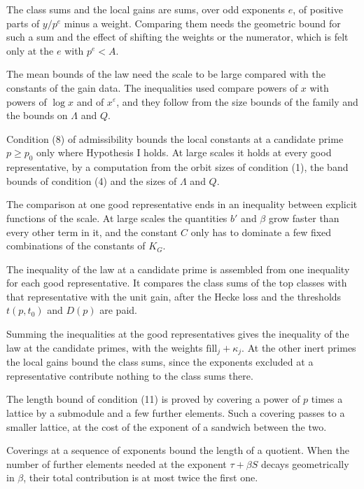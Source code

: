 The class sums and the local gains are sums, over odd exponents $e$, of positive parts of $y/p^e$
minus a weight. Comparing them needs the geometric bound for such a sum and the effect of shifting the
weights or the numerator, which is felt only at the $e$ with $p^e<A$.

The mean bounds of the law need the scale to be large compared with the constants of the gain data.
The inequalities used compare powers of $x$ with powers of $\log x$ and of $x^\varepsilon$, and they
follow from the size bounds of the family and the bounds on $\Lambda$ and $Q$.

Condition (8) of admissibility bounds the local constants at a candidate prime $p\geq p_0$ only where
Hypothesis I holds. At large scales it holds at every good representative, by a computation from the
orbit sizes of condition (1), the band bounds of condition (4) and the sizes of $\Lambda$ and $Q$.

The comparison at one good representative ends in an inequality between explicit functions of the
scale. At large scales the quantities $b'$ and $\beta$ grow faster than every other term in it,
and the constant $C$ only has to dominate a few fixed combinations of the constants of $K_G$.

The inequality of the law at a candidate prime is assembled from one inequality for each good
representative. It compares the class sums of the top classes with that representative with the unit
gain, after the Hecke loss and the thresholds $t(p,t_0)$ and $D(p)$ are paid.

Summing the inequalities at the good representatives gives the inequality of the law at the
candidate primes, with the weights $\mathrm{fill}_j+\kappa_j$. At the other inert primes the local
gains bound the class sums, since the exponents excluded at a representative contribute nothing to
the class sums there.

The length bound of condition (11) is proved by covering a power of $p$ times a lattice by a
submodule and a few further elements. Such a covering passes to a smaller lattice, at the cost of the
exponent of a sandwich between the two.

Coverings at a sequence of exponents bound the length of a quotient. When the number of further
elements needed at the exponent $\tau+\beta S$ decays geometrically in $\beta$, their total
contribution is at most twice the first one.

